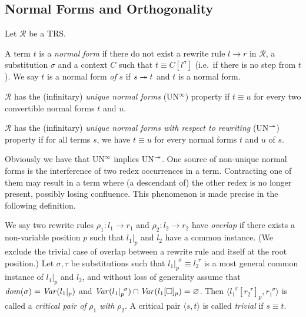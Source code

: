 \subsection{Normal Forms and Orthogonality}

\begin{definition}\label{def:normalisation}%
  Let $\mathcal{R}$ be a TRS.
  \begin{compactenum}
    \item
      A term $t$ is a \emph{normal form} if there do not exist a
      rewrite rule $l \rightarrow r$ in $\mathcal{R}$, a substitution
      $\sigma$ and a context $C$ such that $t \equiv C[l^\sigma]$
      (i.e.\ if there is no step from $t$). We say $t$ is a normal
      form \emph{of} $s$ if $s \twoheadrightarrow t$ and $t$ is a normal form.
    \item
      $\mathcal{R}$ has the (infinitary) \emph{unique normal forms}
      (UN$^\infty$) property if $t \equiv u$ for every two
      convertible normal forms $t$ and $u$.
    \item
      $\mathcal{R}$ has the (infinitary) \emph{unique normal forms
      with respect to rewriting} (UN$^{\twoheadrightarrow}$) property if for all
      terms $s$, we have $t \equiv u$ for every normal forms $t$ and
      $u$ of $s$.
  \end{compactenum}
\end{definition}

Obviously we have that UN$^\infty$ implies UN$^{\twoheadrightarrow}$. One source
of non-unique normal forms is the interference of two redex occurrences
in a term. Contracting one of them may result in a term where (a
descendant of) the other redex is no longer present, possibly losing
confluence. This phenomenon is made precise in the following
definition.

\begin{definition}\label{def:overlap}%
We say two rewrite rules $\rho_1 : l_1 \rightarrow r_1$ and $\rho_2 :
l_2 \rightarrow r_2$ have \emph{overlap} if there exists a
non-variable position $p$ such that $l_1 |_p$ and $l_2$ have a common
instance. (We exclude the trivial case of overlap between a rewrite
rule and itself at the root position.)
Let $\sigma, \tau$ be substitutions such that $l_1 |_p ^{\,\;\sigma}
\equiv l_2 ^{\,\;\tau}$ is a most general common instance of $l_1 |_p$
and $l_2$, and without loss of generality assume that $\mathit{dom}(\sigma) =
\mathit{Var}(l_1 |_p)$ and $\mathit{Var}(l_1 |_p ^{\,\;\sigma}) \cap \mathit{Var}(l_1[\Box]_p)
= \varnothing$. Then $\langle l_1 ^{\,\;\sigma}[r_2^{\,\;\tau}]_p,
r_1^{\,\;\sigma} \rangle$ is called a \emph{critical pair of} $\rho_1$
\emph{with} $\rho_2$. A critical pair $\langle s, t \rangle$ is called
\emph{trivial} if $s \equiv t$.
\end{definition}

